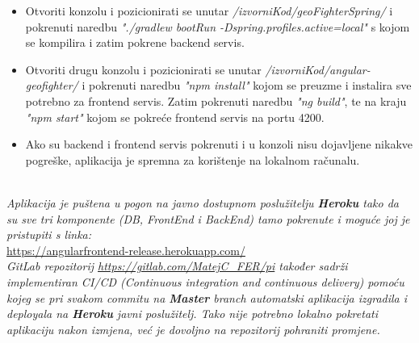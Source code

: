 \begin{itemize}
				
				\item Otvoriti konzolu i pozicionirati se unutar \textit{/izvorniKod/geoFighterSpring/} i pokrenuti naredbu \textit{"./gradlew bootRun -Dspring.profiles.active=local"} s kojom se kompilira i zatim pokrene backend servis.
				
				\item Otvoriti drugu konzolu i pozicionirati se unutar \textit{/izvorniKod/angular-geofighter/} i pokrenuti naredbu \textit{"npm install"} kojom se preuzme i instalira sve potrebno za frontend servis. Zatim pokrenuti naredbu \textit{"ng build"}, te na kraju \textit{"npm start"} kojom se pokreće frontend servis na portu 4200.
				
				\item Ako su backend i frontend servis pokrenuti i u konzoli nisu dojavljene nikakve pogreške, aplikacija je spremna za korištenje na lokalnom računalu.\\\\
				
			\end{itemize}
		
			
			\textit{Aplikacija je puštena u pogon na javno dostupnom poslužitelju \textbf{Heroku} tako da su sve tri komponente (DB, FrontEnd i BackEnd) tamo pokrenute i moguće joj je pristupiti s linka:}\\
			\url{https://angularfrontend-release.herokuapp.com/}\\
						
			\textit{GitLab repozitorij \url{https://gitlab.com/MatejC_FER/pi} također sadrži implementiran CI/CD (Continuous integration and continuous delivery) pomoću kojeg se pri svakom commitu na \textbf{Master} branch automatski aplikacija izgradila i deployala na \textbf{Heroku} javni poslužitelj. Tako nije potrebno lokalno pokretati aplikaciju nakon izmjena, već je dovoljno na repozitorij pohraniti promjene.}
			
			
			\eject 